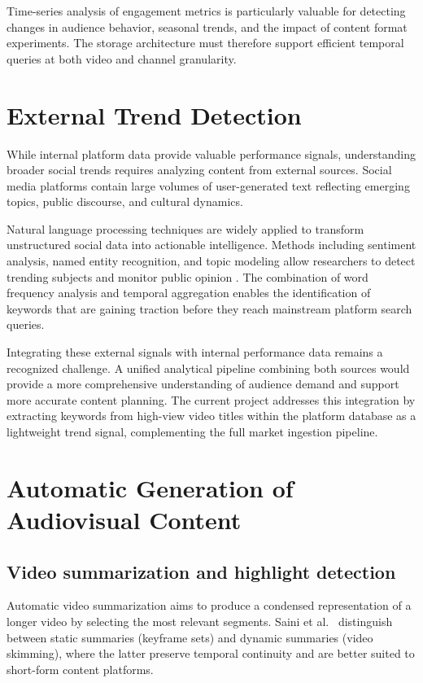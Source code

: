 \documentclass[ENG]{TFUOC}
\begin{document}
Time-series analysis of engagement metrics is particularly valuable for detecting changes in audience behavior, seasonal trends, and the impact of content format experiments. The storage architecture must therefore support efficient temporal queries at both video and channel granularity.

\section{External Trend Detection}

While internal platform data provide valuable performance signals, understanding broader social trends requires analyzing content from external sources. Social media platforms contain large volumes of user-generated text reflecting emerging topics, public discourse, and cultural dynamics.

Natural language processing techniques are widely applied to transform unstructured social data into actionable intelligence. Methods including sentiment analysis, named entity recognition, and topic modeling allow researchers to detect trending subjects and monitor public opinion \cite{singh2025, social_media_nlp}. The combination of word frequency analysis and temporal aggregation enables the identification of keywords that are gaining traction before they reach mainstream platform search queries.

Integrating these external signals with internal performance data remains a recognized challenge. A unified analytical pipeline combining both sources would provide a more comprehensive understanding of audience demand and support more accurate content planning. The current project addresses this integration by extracting keywords from high-view video titles within the platform database as a lightweight trend signal, complementing the full market ingestion pipeline.

\section{Automatic Generation of Audiovisual Content}

\subsection*{Video summarization and highlight detection}

Automatic video summarization aims to produce a condensed representation of a longer video by selecting the most relevant segments. Saini et al.\ \cite{video_summarization_review} distinguish between static summaries (keyframe sets) and dynamic summaries (video skimming), where the latter preserve temporal continuity and are better suited to short-form content platforms.
\end{document}
